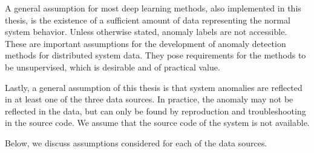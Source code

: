 A general assumption for most deep learning methods, also implemented in this thesis, is the existence of a sufficient amount of data representing the normal system behavior. Unless otherwise stated, anomaly labels are not accessible. These are important assumptions for the development of anomaly detection methods for distributed system data. They pose requirements for the methods to be unsupervised, which is desirable and of practical value.

Lastly, a general assumption of this thesis is that system anomalies are reflected in at least one of the three data sources. In practice, the anomaly may not be reflected in the data, but can only be found by reproduction and troubleshooting in the source code. We assume that the source code of the system is not available.

Below, we discuss assumptions considered for each of the data sources.

